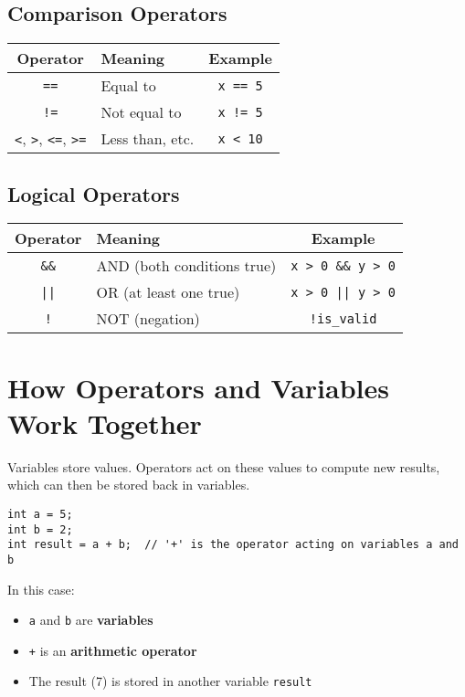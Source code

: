 \documentclass{article}
\begin{document}
\subsection*{Comparison Operators}

\begin{center}
\begin{tabular}{|c|l|c|}
\hline
\textbf{Operator} & \textbf{Meaning} & \textbf{Example} \\
\hline
\texttt{==} & Equal to & \texttt{x == 5} \\
\hline
\texttt{!=} & Not equal to & \texttt{x != 5} \\
\hline
\texttt{<}, \texttt{>}, \texttt{<=}, \texttt{>=} & Less than, etc. & \texttt{x < 10} \\
\hline
\end{tabular}
\end{center}

\subsection*{Logical Operators}

\begin{center}
\begin{tabular}{|c|l|c|}
\hline
\textbf{Operator} & \textbf{Meaning} & \textbf{Example} \\
\hline
\texttt{\&\&} & AND (both conditions true) & \texttt{x > 0 \&\& y > 0} \\
\hline
\texttt{||} & OR (at least one true) & \texttt{x > 0 || y > 0} \\
\hline
\texttt{!} & NOT (negation) & \texttt{!is\_valid} \\
\hline
\end{tabular}
\end{center}

\section{How Operators and Variables Work Together}

Variables store values.  
Operators act on these values to compute new results, which can then be stored back in variables.

\begin{verbatim}
int a = 5;
int b = 2;
int result = a + b;  // '+' is the operator acting on variables a and b
\end{verbatim}

In this case:
\begin{itemize}
    \item \texttt{a} and \texttt{b} are \textbf{variables}
    \item \texttt{+} is an \textbf{arithmetic operator}
    \item The result (7) is stored in another variable \texttt{result}
\end{itemize}
\end{document}
